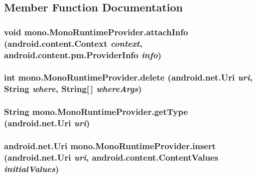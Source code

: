 \subsection{Member Function Documentation}
\hypertarget{classmono_1_1_mono_runtime_provider_4fb9f5a38268fb642d211e7ef0fd9228}{
\subsubsection[{attachInfo}]{\setlength{\rightskip}{0pt plus 5cm}void mono.MonoRuntimeProvider.attachInfo (android.content.Context {\em context}, \/  android.content.pm.ProviderInfo {\em info})}}
\label{classmono_1_1_mono_runtime_provider_4fb9f5a38268fb642d211e7ef0fd9228}


\hypertarget{classmono_1_1_mono_runtime_provider_20fd29ee82e2fbc6ca8e3a7d53e89b9f}{
\subsubsection[{delete}]{\setlength{\rightskip}{0pt plus 5cm}int mono.MonoRuntimeProvider.delete (android.net.Uri {\em uri}, \/  String {\em where}, \/  String\mbox{[}$\,$\mbox{]} {\em whereArgs})}}
\label{classmono_1_1_mono_runtime_provider_20fd29ee82e2fbc6ca8e3a7d53e89b9f}


\hypertarget{classmono_1_1_mono_runtime_provider_b7978ccd79378f86aabc9a1997bff129}{
\subsubsection[{getType}]{\setlength{\rightskip}{0pt plus 5cm}String mono.MonoRuntimeProvider.getType (android.net.Uri {\em uri})}}
\label{classmono_1_1_mono_runtime_provider_b7978ccd79378f86aabc9a1997bff129}


\hypertarget{classmono_1_1_mono_runtime_provider_fbf0b2575d76132ac379064f3f695013}{
\subsubsection[{insert}]{\setlength{\rightskip}{0pt plus 5cm}android.net.Uri mono.MonoRuntimeProvider.insert (android.net.Uri {\em uri}, \/  android.content.ContentValues {\em initialValues})}}
\label{classmono_1_1_mono_runtime_provider_fbf0b2575d76132ac379064f3f695013}


